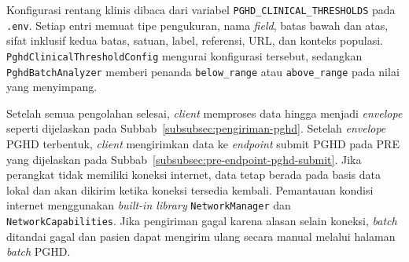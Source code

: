 Konfigurasi rentang klinis dibaca dari variabel \texttt{PGHD\_CLINICAL\_THRESHOLDS} pada \texttt{.env}. 
Setiap entri memuat tipe pengukuran, nama \textit{field}, batas bawah dan atas, sifat inklusif kedua batas, satuan, label, referensi, URL, dan konteks populasi. 
\texttt{PghdClinicalThresholdConfig} mengurai konfigurasi tersebut, sedangkan \texttt{PghdBatchAnalyzer} memberi penanda \texttt{below\_range} atau \texttt{above\_range} pada nilai yang menyimpang. 

Setelah semua pengolahan selesai, \textit{client} memproses data hingga menjadi \textit{envelope} seperti dijelaskan pada Subbab~\ref{subsubsec:pengiriman-pghd}.
Setelah \textit{envelope} PGHD terbentuk, \textit{client} mengirimkan data ke \textit{endpoint} submit PGHD pada PRE yang dijelaskan pada Subbab~\ref{subsubsec:pre-endpoint-pghd-submit}. 
Jika perangkat tidak memiliki koneksi internet, data tetap berada pada basis data lokal dan akan dikirim ketika koneksi tersedia kembali. 
Pemantauan kondisi internet menggunakan \textit{built-in library} \texttt{NetworkManager} dan \texttt{NetworkCapabilities}.
Jika pengiriman gagal karena alasan selain koneksi, \textit{batch} ditandai gagal dan pasien dapat mengirim ulang secara manual melalui halaman \textit{batch} PGHD\@.



